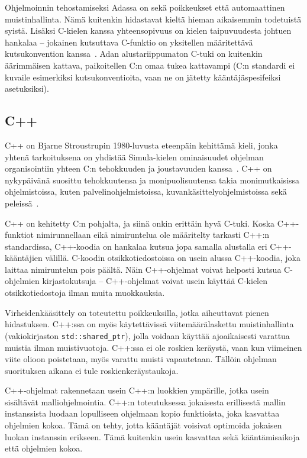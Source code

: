 Ohjelmoinnin tehostamiseksi Adassa on sekä poikkeukset että automaattinen
muistinhallinta. Nämä kuitenkin hidastavat kieltä hieman aikaisemmin todetuistä
syistä. Lisäksi C-kielen kanssa yhteensopivuus on kielen taipuvuudesta johtuen
hankalaa -- jokainen kutsuttava C-funktio on yksitellen määritettävä
kutsukonvention kanssa~\citep[s.~471]{ADA12}. Adan
alustariippumaton C-tuki on kuitenkin äärimmäisen kattava, paikoitellen C:n
omaa tukea kattavampi (C:n standardi ei kuvaile esimerkiksi kutsukonventioita,
vaan ne on jätetty kääntäjäspesifeiksi asetuksiksi).

\subsection{C++}

C++ on Bjarne Stroustrupin 1980-luvusta eteenpäin kehittämä kieli, jonka
yhtenä tarkoituksena on yhdistää Simula-kielen ominaisuudet ohjelman
organisointiin yhteen C:n tehokkuuden ja joustavuuden
kanssa~\citep{cpphistory}. C++ on nykypäivänä suosittu tehokkuutensa ja
monipuolisuutensa takia monimutkaisissa ohjelmistoissa, kuten
palvelinohjelmistoissa, kuvankäsittelyohjelmistoissa sekä
peleissä~\citep{cppapps}.

C++ on kehitetty C:n pohjalta, ja siinä onkin erittäin hyvä C-tuki. Koska
C++\hyp{}funktiot nimirunnellaan eikä nimiruntelua ole määritelty tarkasti C++:n
standardissa, C++-koodia on hankalaa kutsua jopa samalla alustalla eri
C++-kääntäjien välillä. C-koodin otsikkotiedostoissa on
usein alussa C++-koodia, joka laittaa nimiruntelun pois päältä. Näin
C++-ohjelmat voivat helposti kutsua C-ohjelmien kirjastokutsuja -- C++-ohjelmat
voivat usein käyttää C-kielen otsikkotiedostoja ilman muita muokkauksia.

Virheidenkääsittely on toteutettu poikkeuksilla, jotka aiheuttavat pienen
hidastuksen. C++:ssa on myös käytettävissä viitemäärälaskettu muistinhallinta (vakiokirjaston \texttt{std::shared\_ptr}), jolla
voidaan käyttää ajoaikaisesti varattua muistia ilman muistivuotoja. C++:ssa ei
ole roskien keräystä, vaan kun viimeinen viite olioon poistetaan, myös varattu
muisti vapautetaan. Tällöin ohjelman suorituksen aikana ei tule
roskienkeräystaukoja.

C++-ohjelmat rakennetaan usein C++:n luokkien ympärille, jotka usein sisältävät
malliohjelmointia. C++:n toteutuksessa jokaisesta
erillisestä mallin instanssista luodaan lopulliseen ohjelmaan kopio
funktioista, joka kasvattaa ohjelmien kokoa. Tämä on tehty, jotta kääntäjät
voisivat optimoida jokaisen luokan instanssin erikseen. Tämä kuitenkin usein
kasvattaa sekä kääntämisaikoja että ohjelmien kokoa.

